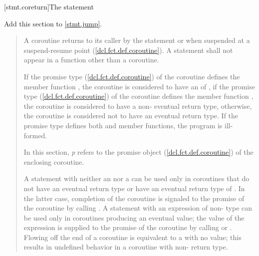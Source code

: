 [stmt.coreturn]{The  statement}%

Add this section to \ref{stmt.jump}.

\begin{quote}

\pnum
A coroutine returns to its caller by the  statement
or when suspended at a suspend-resume point (\ref{dcl.fct.def.coroutine}). A  statement shall not appear in a function other than a coroutine.

\pnum
  If the promise type (\ref{dcl.fct.def.coroutine}) of the coroutine defines the member function , the coroutine is considered to have an  of , if the promise type (\ref{dcl.fct.def.coroutine}) of the coroutine defines the member function , the coroutine is considered to have a non- eventual return  type, otherwise, the coroutine is considered not to have an eventual return type. If the promise type defines both  and  member functions, the program is ill-formed.

\pnum
In this section, \textit{p} refers to the promise object  
(\ref{dcl.fct.def.coroutine})
of the enclosing coroutine.

\pnum
A  statement
with neither an  nor a 
can be used only in coroutines
that do not have an eventual return type or have an eventual return type of . In the latter case, completion of the coroutine
is signaled to the promise of the coroutine by calling .
A  statement with an expression of non- type can be used only
in coroutines producing an eventual value; the value of the expression is supplied to the promise of the coroutine by calling 
 or
. Flowing off the end of a coroutine is equivalent to a  with no value; this results in undefined
behavior in a coroutine with non- return type.


%


\end{quote}

